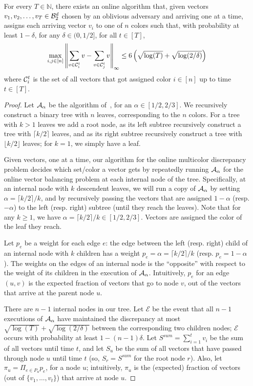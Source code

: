 \begin{theorem}\label{thm: multi color main upper bound}
    For every $T \in \mathbb{N}$, there exists an online algorithm that, given vectors $v_1, v_2, \ldots, v_T \in \mathcal{B}^d_2$ chosen by an oblivious adversary and arriving one at a time, assigns each arriving vector $v_i$ to one of $n$ colors such that, with probability at least $1-\delta$, for any $\delta \in (0,1/2]$, for all $t \in [T]$,
    \[\max_{i,j \in [n]} \left\lVert\sum_{v \in \mathcal{C}^t_i} v - \sum_{v \in \mathcal{C}^t_j} v\right\rVert_\infty \leq 6 \left( \sqrt{\log(T)} + \sqrt{\log(2/\delta)} \right) \]
 where $\mathcal{C}^t_i$ is the set of all vectors that got assigned color $i \in [n]$ up to time $t \in [T]$.
\end{theorem}
\begin{proof}
    Let $\mathcal{A}_\alpha$ be the algorithm of~, for an $\alpha \in [1/2, 2/3]$. We recursively construct a binary tree with $n$ leaves, corresponding to the $n$ colors. For a tree with $k > 1$ leaves we add a root node, as its left subtree recursively construct a tree with $\lceil k/2\rceil$ leaves, and as its right subtree recursively construct a tree with $\lfloor k/2\rfloor$ leaves; for $k=1$, we simply have a leaf. 
    
    Given vectors, one at a time, our algorithm for the online multicolor discrepancy problem decides which set/color a vector gets by repeatedly running $\mathcal{A}_\alpha$ for the online vector balancing problem at each internal node of the tree. Specifically, at an internal node with $k$ descendent leaves, we will run a copy of $\mathcal{A}_\alpha$ by setting $\alpha = \lceil k/2\rceil/k$, and by recursively passing the vectors that are assigned $1-\alpha$ (resp. $-\alpha$) to the left (resp. right) subtree (until they reach the leaves). Note that for any $k \geq 1$, we have $\alpha = \lceil k/2\rceil/k \in [1/2, 2/3]$. Vectors are assigned the color of the leaf they reach.

    Let $p_e$ be a weight for each edge $e$: the edge between the left (resp. right) child of an internal node with $k$ children has a weight $p_e = \alpha = \lceil k/2\rceil/k$ (resp. $p_e = 1 - \alpha$). The weights on the edges of an internal node is the ``opposite'' with respect to the weight of its children in the execution of $\mathcal{A}_\alpha$. Intuitively, $p_e$ for an edge $(u,v)$ is the expected fraction of vectors that go to node $v$, out of the vectors that arrive at the parent node $u$.

    There are $n-1$ internal nodes in our tree. Let $\mathcal{E}$ be the event that all $n-1$ executions of $\mathcal{A}_\alpha$ have maintained the discrepancy at most $\sqrt{\log(T)} + \sqrt{\log(2/ \delta)}$ between the corresponding two children nodes; $\mathcal{E}$ occurs with probability at least $1 - (n-1)\delta$. Let $S^{sum} = \sum_{i=1}^t v_i$ be the sum of all vectors until time $t$, and let $S_u$ be the sum of all vectors that have passed through node $u$ until time $t$ (so, $S_r = S^{sum}$ for the root node $r$). Also, let $\pi_u = \Pi_{e \in P_u} p_e$, for a node $u$; intuitively, $\pi_u$ is the (expected) fraction of vectors (out of $\{ v_1, \dots, v_t \}$) that arrive at node $u$.    


\end{proof}
